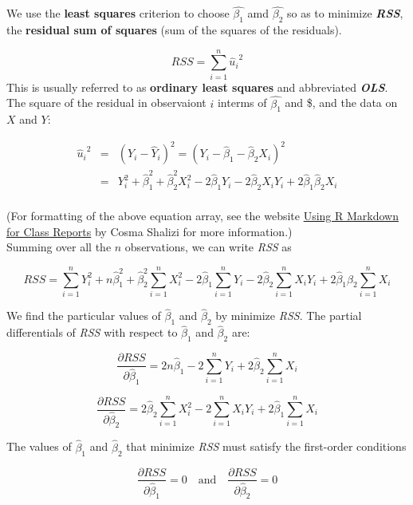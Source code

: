 \documentclass[
]{article}
\begin{document}
We use the \textbf{least squares} criterion to choose
\(\hat{\beta_{1}}\) amd \(\hat{\beta_{2}}\) so as to minimize
\emph{\textbf{RSS}}, the \textbf{residual sum of squares} (sum of the
squares of the residuals).

\[RSS=\sum_{i=1}^{n}{\hat{u}_{i}}^2\] This is usually referred to as
\textbf{ordinary least squares} and abbreviated \emph{\textbf{OLS}}.\\
The square of the residual in observaiont \(i\) interms of
\(\hat{\beta_{1}}\) and \$, and the data on \(X\) and
\(Y\):

\begin{eqnarray}
{\hat{u}_{i}}^2 &=&(Y_i-\hat{Y}_{i})^2 =(Y_i-\hat{\beta}_{1}-\hat{\beta}_{2}X_i)^2 \\

&=& Y_i^2+\hat{\beta}_{1}^2+\hat{\beta}_{2}^2X_i^2-2\hat{\beta}_{1}Y_i-2\hat{\beta}_{2}X_iY_i+2\hat{\beta}_{1}\hat{\beta}_{2}X_i \\
\end{eqnarray}

(For formatting of the above equation array, see the website
\href{https://www.stat.cmu.edu/~cshalizi/rmarkdown/}{Using R Markdown
for Class Reports} by Cosma Shalizi for more information.)\\

Summing over all the \(n\) observations, we can write \emph{RSS} as

\[RSS=\sum_{i=1}^{n}Y_i^2+n\hat{\beta}_{1}^2+\hat{\beta}_{2}^2\sum_{i=1}^{n}X_i^2-2\hat{\beta}_{1}\sum_{i=1}^{n}Y_i-2\hat{\beta}_{2}\sum_{i=1}^{n}X_iY_i+2\hat{\beta}_{1}\hat{\beta}_{2}\sum_{i=1}^{n}X_i\]

We find the particular values of \(\hat{\beta}_{1}\) and
\(\hat{\beta}_{2}\) by minimize \emph{RSS}. The partial differentials of
\emph{RSS} with respect to \(\hat{\beta}_{1}\) and \(\hat{\beta}_{2}\)
are:

\[\frac{\partial{RSS}}{\partial{\hat{\beta}_{1}}}=2n\hat{\beta}_{1}-2\sum_{i=1}^{n}Y_i+2\hat{\beta}_{2}\sum_{i=1}^{n}X_i\]

\[\frac{\partial{RSS}}{\partial{\hat{\beta}_{2}}}=2\hat{\beta}_{2}\sum_{i=1}^{n}X_i^2-2\sum_{i=1}^{n}X_iY_i+2\hat{\beta}_{1}\sum_{i=1}^{n}X_i\]

The values of \(\hat{\beta}_{1}\) and \(\hat{\beta}_{2}\) that minimize
\emph{RSS} must satisfy the first-order conditions

\begin{equation}
\frac{\partial{RSS}}{\partial{\hat{\beta}_{1}}}=0
\quad\mathrm{and}\quad
\frac{\partial{RSS}}{\partial{\hat{\beta}_{2}}}=0
\end{equation}
\end{document}
